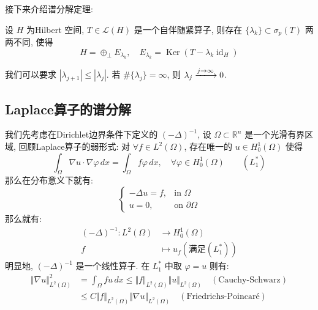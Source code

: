 \documentclass[11pt]{ctexart}[UTF8]
\begin{document}
接下来介绍谱分解定理:
\begin{theorem}
    设 $H$ 为Hilbert 空间, $T \in \mathcal{L}(H)$ 是一个自伴随紧算子, 则存在 $\{ \lambda_{k} \} \subset \sigma_{p}(T)$ 两两不同, 使得
    \begin{equation*}
        H = \oplus_{\perp} E_{\lambda_k}, \quad E_{\lambda_k} = \operatorname{Ker}(T-\lambda_k \operatorname{id}_{H})
    \end{equation*}
\end{theorem}
\begin{remark}
    我们可以要求 $|\lambda_{j+1}| \leq |\lambda_j|$. 若 $\# \{ \lambda_{j} \} = \infty$, 则 $\lambda_j \xlongrightarrow{j \to \infty} 0$.
\end{remark}
\subsection{Laplace算子的谱分解}
我们先考虑在Dirichlet边界条件下定义的 $(-\Delta)^{-1}$, 设 $\Omega \subset \mathbb{R}^n$ 是一个光滑有界区域, 回顾Laplace算子的弱形式: 对 $\forall f\in L^2(\Omega)$, 存在唯一的 $u \in H_0^1(\Omega)$ 使得
    \begin{equation*}
        \int_{\Omega} \nabla u \cdot \nabla \varphi \, dx = \int_{\Omega} f \varphi \, dx, \quad \forall \varphi \in H_0^1(\Omega) \quad\quad (L_1^*)
    \end{equation*}
那么在分布意义下就有:
\begin{equation*}
    \begin{cases}
        -\Delta u = f, & \text{in } \Omega\\
        u = 0, & \text{on } \partial \Omega
    \end{cases}
\end{equation*}
那么就有:
\begin{equation*}
    \begin{aligned}
        (-\Delta)^{-1} : L^2(\Omega) &\to H_0^1(\Omega)\\
        f &\mapsto u_{f}(\text{满足}(L_1^*))
    \end{aligned}
\end{equation*}
明显地, $(-\Delta)^{-1}$ 是一个线性算子. 在 $L_{1}^*$ 中取 $\varphi = u$ 则有:
\begin{equation*}
    \begin{aligned}
        \Vert \nabla u \Vert_{L^2(\Omega)}^2 &= \int_{\Omega} f u \, dx \leq \Vert f \Vert_{L^2(\Omega)} \Vert u \Vert_{L^2(\Omega)} \quad (\text{Cauchy-Schwarz})\\
                                            &\leq C \Vert f \Vert_{L^2(\Omega)} \Vert \nabla u \Vert_{L^2(\Omega)} \quad (\text{Friedrichs-Poincaré})\\
    \end{aligned}
\end{equation*}
\end{document}

